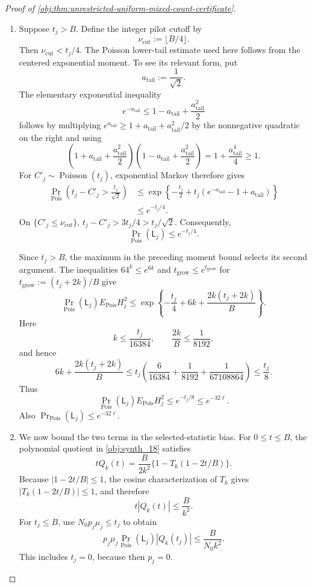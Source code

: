 \begin{proof}[Proof of \cref{obj:thm:unrestricted-uniform-mixed-count-certificate}]
\begin{enumerate}
\item Suppose \(t_j>B\). Define the integer pilot cutoff by
\[
\nu_{\mathrm{cut}}:=\lfloor B/4\rfloor.
\]
Then \(\nu_{\mathrm{cut}}<t_j/4\). The Poisson lower-tail estimate used here
follows from the centered exponential moment. To see its relevant form,
put
\[
a_{\mathrm{tail}}:=\frac1{\sqrt2}.
\]
The elementary exponential inequality
\[
e^{-a_{\mathrm{tail}}}
\le1-a_{\mathrm{tail}}+\frac{a_{\mathrm{tail}}^2}{2}
\]
follows by multiplying
\(e^{a_{\mathrm{tail}}}\ge
1+a_{\mathrm{tail}}+a_{\mathrm{tail}}^2/2\) by the nonnegative quadratic
on the right and using
\[
\left(1+a_{\mathrm{tail}}+\frac{a_{\mathrm{tail}}^2}{2}\right)
\left(1-a_{\mathrm{tail}}+\frac{a_{\mathrm{tail}}^2}{2}\right)
=1+\frac{a_{\mathrm{tail}}^4}{4}\ge1.
\]
For \(C'_j\sim\operatorname{Poisson}(t_j)\), exponential Markov therefore
gives
\[
\begin{aligned}
\Pr_{\mathrm{Pois}}\left(t_j-C'_j>\frac{t_j}{\sqrt2}\right)
&\le
\exp\left\{-\frac{t_j}{2}
+t_j(e^{-a_{\mathrm{tail}}}-1+a_{\mathrm{tail}})\right\}\\
&\le e^{-t_j/4}.
\end{aligned}
\]
On \(\{C'_j\le\nu_{\mathrm{cut}}\}\),
\(t_j-C'_j>3t_j/4>t_j/\sqrt2\). Consequently,
\[
\Pr_{\mathrm{Pois}}(\mathsf L_j)\le e^{-t_j/4}.
\]

Since \(t_j>B\), the maximum in the preceding moment bound selects its
second argument. The inequalities \(64^k\le e^{6k}\) and
\(t_{\mathrm{grow}}\le e^{t_{\mathrm{grow}}}\) for
\(t_{\mathrm{grow}}:=(t_j+2k)/B\) give
\[
\Pr_{\mathrm{Pois}}(\mathsf L_j)E_{\mathrm{Pois}}H_j^2
\le
\exp\left\{-\frac{t_j}{4}
+6k+\frac{2k(t_j+2k)}{B}\right\}.
\]
Here
\[
k\le\frac{t_j}{16384},
\qquad \frac{2k}{B}\le\frac1{8192},
\]
and hence
\[
6k+\frac{2k(t_j+2k)}B
\le
t_j\left(\frac6{16384}+\frac1{8192}
+\frac1{67108864}\right)
\le\frac{t_j}{8}.
\]
Thus
\[
\Pr_{\mathrm{Pois}}(\mathsf L_j)E_{\mathrm{Pois}}H_j^2
\le e^{-t_j/8}\le e^{-32\ell}.
\]
Also \(\Pr_{\mathrm{Pois}}(\mathsf L_j)\le e^{-32\ell}\).

\item We now bound the two terms in the selected-statistic bias.
For \(0\le t\le B\), the polynomial quotient in
\cref{obj:synth_18} satisfies
\[
tQ_k(t)=\frac{B}{2k^2}\{1-T_k(1-2t/B)\}.
\]
Because \(|1-2t/B|\le1\), the cosine characterization of \(T_k\) gives
\(|T_k(1-2t/B)|\le1\), and therefore
\[
t|Q_k(t)|\le\frac B{k^2}.
\]
For \(t_j\le B\), use \(N_0p_j\mu_j\le t_j\) to obtain
\[
p_j\mu_j
\Pr_{\mathrm{Pois}}(\mathsf L_j)|Q_k(t_j)|
\le\frac{B}{N_0k^2}.
\]
This includes \(t_j=0\), because then \(p_j=0\).


\end{enumerate}
\end{proof}
